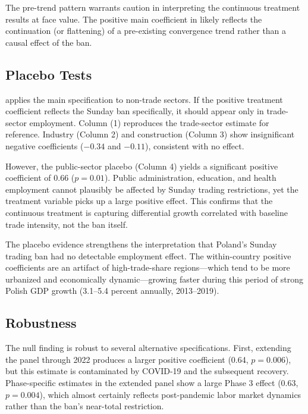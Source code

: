 \documentclass[12pt]{article}
\begin{document}
The pre-trend pattern warrants caution in interpreting the continuous treatment results at face value. The positive main coefficient in  likely reflects the continuation (or flattening) of a pre-existing convergence trend rather than a causal effect of the ban.




\subsection{Placebo Tests}

 applies the main specification to non-trade sectors. If the positive treatment coefficient reflects the Sunday ban specifically, it should appear only in trade-sector employment. Column (1) reproduces the trade-sector estimate for reference. Industry (Column 2) and construction (Column 3) show insignificant negative coefficients ($-0.34$ and $-0.11$), consistent with no effect.

However, the public-sector placebo (Column 4) yields a significant positive coefficient of 0.66 ($p = 0.01$). Public administration, education, and health employment cannot plausibly be affected by Sunday trading restrictions, yet the treatment variable picks up a large positive effect. This confirms that the continuous treatment is capturing differential growth correlated with baseline trade intensity, not the ban itself.

The placebo evidence strengthens the interpretation that Poland's Sunday trading ban had no detectable employment effect. The within-country positive coefficients are an artifact of high-trade-share regions---which tend to be more urbanized and economically dynamic---growing faster during this period of strong Polish GDP growth (3.1--5.4 percent annually, 2013--2019).




\subsection{Robustness}

The null finding is robust to several alternative specifications. First, extending the panel through 2022 produces a larger positive coefficient (0.64, $p = 0.006$), but this estimate is contaminated by COVID-19 and the subsequent recovery. Phase-specific estimates in the extended panel show a large Phase 3 effect (0.63, $p = 0.004$), which almost certainly reflects post-pandemic labor market dynamics rather than the ban's near-total restriction.
\end{document}
